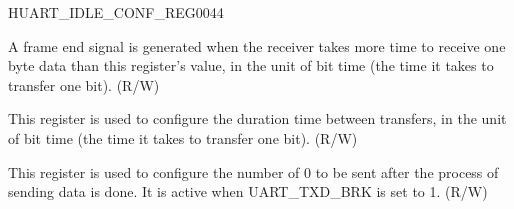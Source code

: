 \begin{register}{H}{UART\_IDLE\_CONF\_REG}{\hexprefix{}0044}\label{regdesc:UARTIDLECONFREG}
%
%
%
%
\regnewline%
\begin{regdesc}\begin{reglist}
\label{fielddesc:UARTRXIDLETHRHD}\item [UART\_RX\_IDLE\_THRHD] A frame end signal is generated when the receiver takes more time to receive one byte data than this register's value, in the unit of bit time (the time it takes to transfer one bit). (R/W)
\label{fielddesc:UARTTXIDLENUM}\item [UART\_TX\_IDLE\_NUM] This register is used to configure the duration time between transfers, in the unit of bit time (the time it takes to transfer one bit). (R/W)
\label{fielddesc:UARTTXBRKNUM}\item [UART\_TX\_BRK\_NUM] This register is used to configure the number of 0 to be sent after the process of sending data is done. It is active when UART\_TXD\_BRK is set to 1. (R/W)
\end{reglist}\end{regdesc}
\end{register}


